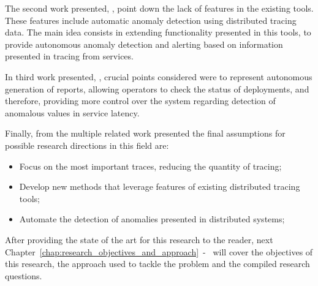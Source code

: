 The second work presented, , point down the lack of features in the existing tools. These features include automatic anomaly detection using distributed tracing data. The main idea consists in extending functionality presented in this tools, to provide autonomous anomaly detection and alerting based on information presented in tracing from services.

In third work presented, , crucial points considered were to represent autonomous generation of reports, allowing operators to check the status of deployments, and therefore, providing more control over the system regarding detection of anomalous values in service latency.

Finally, from the multiple related work presented the final assumptions for possible research directions in this field are:

\begin{itemize}
    \item Focus on the most important traces, reducing the quantity of tracing;
    \item Develop new methods that leverage features of existing distributed tracing tools;
    \item Automate the detection of anomalies presented in distributed systems;
\end{itemize}

After providing the state of the art for this research to the reader, next Chapter~\ref{chap:research_objectives_and_approach}~-~ will cover the objectives of this research, the approach used to tackle the problem and the compiled research questions.

\checkoddpage
{}
{ %
    \newpage
    \blankpage}
{ %
}